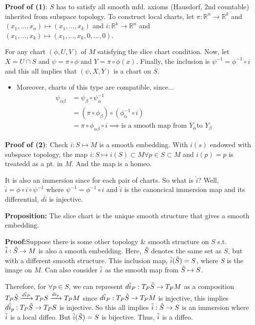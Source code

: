 \documentclass[12pt,letterpaper]{article}
\begin{document}
\textbf{Proof of (1)}: 
$S$ has to satisfy all smooth mfd. axioms (Hausdorf, 2nd countable) inherited from subspace topology. To construct local charts, let $\pi: \mathbb{R}^n \rightarrow \mathbb{R}^k$ and $(x_1, \dots, x_n) \mapsto (x_1, \dots, x_k)$ and $i: \mathbb{R}^k \rightarrow \mathbb{R}^n$ and $(x_1, \dots, x_k) \mapsto (x_1, \dots, x_k, 0, \dots, 0)$. 

For any chart $(\phi, U, V)$ of $M$ satisfying the slice chart condition. Now, let $X = U \cap S$ and $\psi = \pi \circ \phi$ and $Y = \pi \circ \phi(x)$. Finally, the inclusion is $\psi^{-1} = \phi^{-1} \circ i$ and this all implies that $(\psi, X, Y)$ is a chart on $S$. 
\begin{itemize}
    \item Moreover, charts of this type are compatible, since...
    \begin{align*}
        \psi_{\alpha \beta} &= \psi_{\beta} \circ \psi_{\alpha}^{-1} \\
        &= (\pi \circ \phi_{\beta}) \circ (\phi_{\alpha}^{-1} \circ i) \\
        &= \pi \circ \phi_{\alpha \beta} \circ i \implies \text{is a smooth map from } Y_{\alpha} \text{to } Y_{\beta}
    \end{align*}
\end{itemize}

\textbf{Proof of (2)}: 
Check $i: S \mapsto M$ is a smooth embedding. With $i(s)$ endowed with subspace topology, the map $i: S \mapsto i(S) \subset M \forall p \in S\subset M$ and $i(p) = p$ is treatedd as a pt. in $M$. And the map is a homeo.

It is also an immersion since for each pair of charts. So what is $\hat{i}$? Well, $\hat{i} =\phi \circ i \circ \psi^{-1}$ where $\psi^{-1} =  \phi^{-1} \circ i$ and $\hat{i}$ is the canoncical immersion map and its differential, $d\hat{i}$ is injective. 

\textbf{Proposition:} The slice chart is the unique smooth structure that gives a smooth embedding. 

\textbf{Proof:}Suppose there is some other topology & smooth structure on $S$ s.t. $\Tilde{i} : \Tilde{S}\rightarrow M$ is also a smooth embedding. Here, $\Tilde{S}$ denotes the same set as $S$, but with a different smooth structure. This inclusion map, $\Tilde{i}(\Tilde{S}) = S$, where $S$ is the image on $M$. Can also consider $\Tilde{i}$ as the smooth map from $\Tilde{S} \mapsto S$.

Therefore, for $\forall p \in S$, we can represent $d\Tilde{i}_P : T_P\Tilde{S} \rightarrow T_P M$ as a composition $T_P \Tilde{S} \xrightarrow{d\Tilde{i}_P} T_P S \xrightarrow{di_p} T_P M$ since $d\Tilde{i}_P: T_P \Tilde{S} \rightarrow T_P M$  is injective, this implies $d\hat{i}_p :T_P \Tilde{S} \rightarrow T_P S$ is injective. So this all implies $\Tilde{i}: \Tilde{S} \rightarrow S$ is an immersion where $\Tilde{i}$ is a local diffeo. But $\Tilde{i}(\Tilde{S}) = S$ is bijective. Thus, $\Tilde{i}$ is a diffeo.
\end{document}

